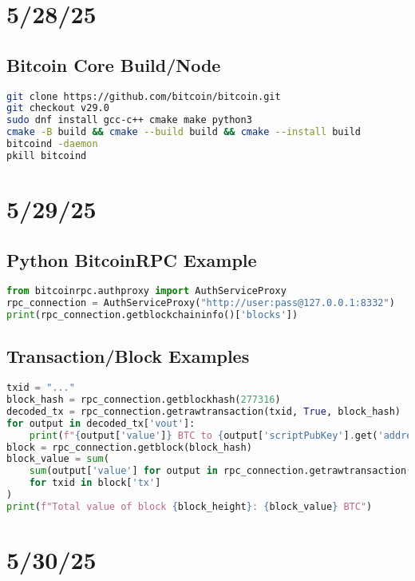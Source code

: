 \documentclass{article}
\begin{document}
\section*{5/28/25}

\subsection*{Bitcoin Core Build/Node}
\begin{lstlisting}[language=bash]
git clone https://github.com/bitcoin/bitcoin.git
git checkout v29.0
sudo dnf install gcc-c++ cmake make python3
cmake -B build && cmake --build build && cmake --install build
bitcoind -daemon
pkill bitcoind
\end{lstlisting}

\section*{5/29/25}

\subsection*{Python BitcoinRPC Example}
\begin{lstlisting}[language=Python]
from bitcoinrpc.authproxy import AuthServiceProxy
rpc_connection = AuthServiceProxy("http://user:pass@127.0.0.1:8332")
print(rpc_connection.getblockchaininfo()['blocks'])
\end{lstlisting}

\subsection*{Transaction/Block Examples}
\begin{lstlisting}[language=Python]
txid = "..."
block_hash = rpc_connection.getblockhash(277316)
decoded_tx = rpc_connection.getrawtransaction(txid, True, block_hash)
for output in decoded_tx['vout']:
    print(f"{output['value']} BTC to {output['scriptPubKey'].get('addresses', ['Unknown'])[0]}")
block = rpc_connection.getblock(block_hash)
block_value = sum(
    sum(output['value'] for output in rpc_connection.getrawtransaction(txid, True, block_hash)['vout'])
    for txid in block['tx']
)
print(f"Total value of block {block_height}: {block_value} BTC")
\end{lstlisting}

\section*{5/30/25}
\end{document}
